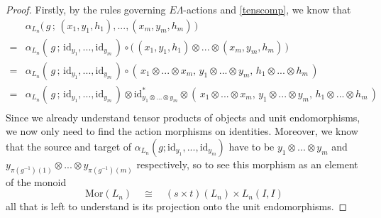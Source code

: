 \documentclass{amsbook} %
\newcommand{\MorLn}{\mathrm{Mor}(L_n)}
\numberwithin{section}{chapter}
\begin{document}
\begin{proof}
Firstly, by the rules governing $E\Lambda$-actions and \cref{tenscomp}, we know that
\[ \begin{array}{rl} 
			& \alpha_{L_n}\big( \, g \, ; \, (x_1, y_1, h_1), ..., (x_m, y_m, h_m) \, \big) \\
			= & \alpha_{L_n}( \, g \, ; \, \mathrm{id}_{y_1}, ..., \mathrm{id}_{y_m} \, ) \circ \big( \, (x_1, y_1, h_1) \otimes ... \otimes (x_m, y_m, h_m) \, \big) \\
			= & \alpha_{L_n}( \, g \, ; \, \mathrm{id}_{y_1}, ..., \mathrm{id}_{y_m} \, ) \circ ( \, x_1 \otimes ... \otimes x_m, \, y_1 \otimes ... \otimes y_m, \, h_1 \otimes ... \otimes h_m \, ) \\
			= & \alpha_{L_n}( \, g \, ; \, \mathrm{id}_{y_1}, ..., \mathrm{id}_{y_m} \, ) \otimes \mathrm{id}_{y_1 \otimes ... \otimes y_m}^* \otimes ( \, x_1 \otimes ... \otimes x_m, \, y_1 \otimes ... \otimes y_m, \, h_1 \otimes ... \otimes h_m \, ) \\
		\end{array}
\]
Since we already understand tensor products of objects and unit endomorphisms, we now only need to find the action morphisms on identities. Moreover, we know that the source and target of $\alpha_{L_n}(g; \mathrm{id}_{y_1}, ..., \mathrm{id}_{y_m})$ have to be $y_1 \otimes ... \otimes y_m$ and $y_{\pi(g^{-1})(1)} \otimes ... \otimes y_{\pi(g^{-1})(m)}$ respectively, so to see this morphism as an element of the monoid
\[ \MorLn \quad \cong \quad (s \times t)(L_n) \times L_n(I,I) \]
all that is left to understand is its projection onto the unit endomorphisms.


\end{proof}
\end{document}

